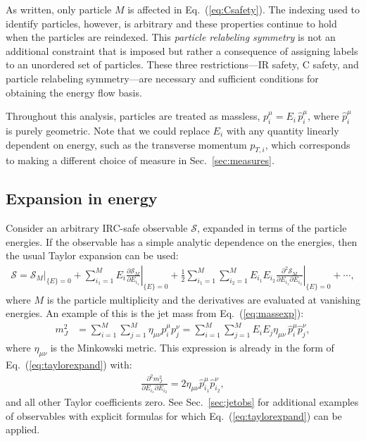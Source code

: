\documentclass[letterpaper,11pt]{article}
\newcommand{\pd}[2]{\frac{\partial #1}{\partial #2}}
\DeclareRobustCommand{\Sec}[1]{Sec.~\ref{#1}}
\DeclareRobustCommand{\Eq}[1]{Eq.~(\ref{#1})}
\begin{document}
As written, only particle $M$ is affected in \Eq{eq:Csafety}.
%
The indexing used to identify particles, however, is arbitrary and these properties continue to hold when the particles are reindexed.
%
This \emph{particle relabeling symmetry} is not an additional constraint that is imposed but rather a consequence of assigning labels to an unordered set of particles.
%
These three restrictions---IR safety, C safety, and particle relabeling symmetry---are necessary and sufficient conditions for obtaining the energy flow basis.

Throughout this analysis, particles are treated as massless, $p^\mu_i = E_i \,\hat p_i^\mu$, where $\hat p_i^\mu$ is purely geometric.
%
Note that we could replace $E_i$ with any quantity linearly dependent on energy, such as the transverse momentum $p_{T,i}$, which corresponds to making a different choice of measure in \Sec{sec:measures}.


\subsection{Expansion in energy}
\label{sec:Eexpansion}

Consider an arbitrary IRC-safe observable $\mathcal{S}$, expanded in terms of the particle energies.
%
If the observable has a simple analytic dependence on the energies, then the usual Taylor expansion can be used:
\begin{align}\label{eq:taylorexpand}
\mathcal S=\left.\mathcal S_M\right|_{\{E\}=0}+\sum_{i_1=1}^ME_i\left.\pd{\mathcal S_M}{E_{i_1}}\right|_{\{E\}=0}+\frac{1}{2}\sum_{i_1=1}^M\sum_{i_2=1}^ME_{i_1}E_{i_2}\left.\pd{^2\mathcal S_M}{E_{i_1}\partial E_{i_2}}\right|_{\{E\}=0}+\cdots,
\end{align}
where $M$ is the particle multiplicity and the derivatives are evaluated at vanishing energies. 
%
An example of this is the jet mass from \Eq{eq:massexp}:
\begin{align}\label{eq:jetmass}
m_J^2&=\sum_{i=1}^M\sum_{j=1}^M \eta_{\mu\nu}p_i^\mu p_{j}^\nu=\sum_{i=1}^M\sum_{j=1}^ME_iE_j\eta_{\mu\nu}\, \hat p_i^\mu\hat p_j^\nu,
\end{align}
where $\eta_{\mu \nu}$ is the Minkowski metric.  
%
This expression is already in the form of \Eq{eq:taylorexpand} with:
\begin{align}
\pd{^2m_J^2}{E_{i_1}\partial E_{i_2}}=2\eta_{\mu\nu}\hat p_{i_1}^\mu\hat p_{i_2}^\nu,
\end{align}
and all other Taylor coefficients zero.
%
See \Sec{sec:jetobs} for additional examples of observables with explicit formulas for which \Eq{eq:taylorexpand} can be applied.
\end{document}
